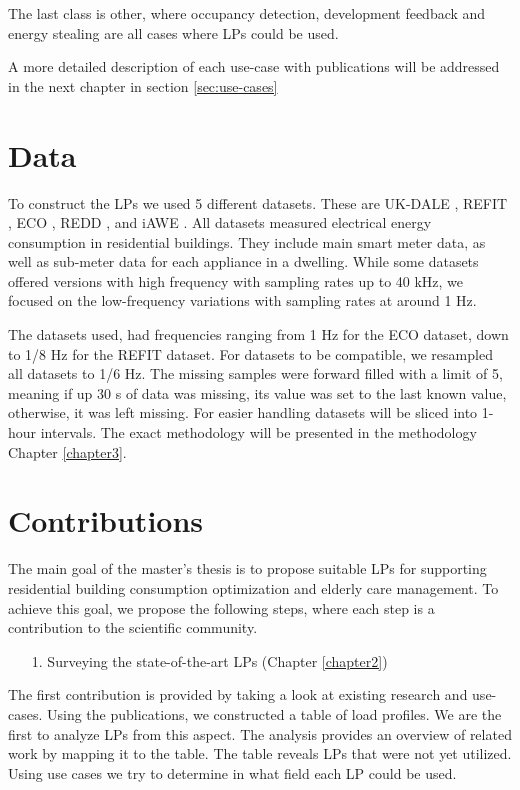 The last class is other, where occupancy detection, development feedback and energy stealing are all cases where LPs could be used. 

A more detailed description of each use-case with publications will be addressed in the next chapter in section \ref{sec:use-cases}

\section{Data}

To construct the LPs we used 5 different datasets.
These are UK-DALE \cite{UKDALE}, REFIT \cite{REFIT}, ECO \cite{ECO}, REDD \cite{REDD}, and iAWE \cite{iAWE}.
All datasets measured electrical energy consumption in residential buildings.
They include main smart meter data, as well as sub-meter data for each appliance in a dwelling. 
While some datasets offered versions with high frequency with sampling rates up to 40 kHz,
we focused on the low-frequency variations with sampling rates at around 1 Hz.

The datasets used, had frequencies ranging from 1 Hz for the ECO dataset, down to 1/8 Hz for the REFIT dataset.
For datasets to be compatible, we resampled all datasets to 1/6 Hz.
The missing samples were forward filled with a limit of 5, meaning if up 30 s of data was missing, its value was set to the last known value, otherwise, it was left missing.
For easier handling datasets will be sliced into 1-hour intervals.
The exact methodology will be presented in the methodology Chapter \ref{chapter3}. 

\section{Contributions}
\label{sec:contributions} 

The main goal of the master's thesis is to propose suitable LPs for supporting residential building consumption optimization and elderly care management.
To achieve this goal, we propose the following steps, where each step is a contribution to the scientific community.

\begin{enumerate}
	\item[1.] Surveying the state-of-the-art LPs (Chapter \ref{chapter2})
\end{enumerate}

The first contribution is provided by taking a look at existing research and use-cases. 
Using the publications, we constructed a table of load profiles.
We are the first to analyze LPs from this aspect. 
The analysis provides an overview of related work by mapping it to the table.
The table reveals LPs that were not yet utilized.
Using use cases we try to determine in what field each LP could be used.

